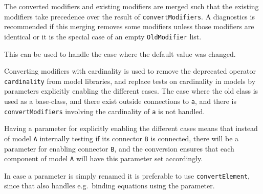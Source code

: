 The converted modifiers and existing modifiers are merged such that the existing modifiers take precedence over the result of \lstinline!convertModifiers!.
A diagnostics is recommended if this merging removes some modifiers unless those modifiers are identical or it is the special case of an empty \lstinline!OldModifier! list.
\begin{nonnormative}
This can be used to handle the case where the default value was changed.
\end{nonnormative}

Converting modifiers with cardinality is used to remove the deprecated operator \lstinline!cardinality! from model libraries, and replace tests on cardinality in models by parameters explicitly enabling the different cases.  The case where the old class is used as a base-class, and there exist outside connections to \lstinline!a!, and there is \lstinline!convertModifiers! involving the cardinality of \lstinline!a! is not handled.

\begin{nonnormative}
Having a parameter for explicitly enabling the different cases means that instead of model \lstinline!A! internally testing if its
connector \lstinline!B! is connected, there will be a parameter for enabling connector \lstinline!B!, and the conversion ensures that
each component of model \lstinline!A! will have this parameter set accordingly.

In case a parameter is simply renamed it is preferable to use \lstinline!convertElement!, since that also handles e.g.\ binding equations
using the parameter.
\end{nonnormative}



